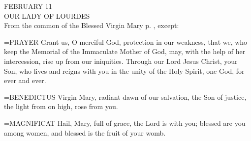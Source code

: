 \begin{center}\normalsize FEBRUARY 11\\
\footnotesize OUR LADY OF LOURDES\\
\footnotesize From the common of the Blessed Virgin Mary p.   , except:\\
\end{center}

\hangindent=\parindent \small{PRAYER 
Grant us, O merciful God, protection in our weakness,
that we, who keep the Memorial of the Immaculate Mother of God,
may, with the help of her intercession,
rise up from our iniquities.
Through our Lord Jesus Christ, your Son,
who lives and reigns with you in the unity of the Holy Spirit,
one God, for ever and ever.\\}
 
\hangindent=\parindent \small{BENEDICTUS  Virgin Mary, radiant dawn of our salvation, the Son of
justice, the light from on high, rose from you.\\}
 
\hangindent=\parindent \small{MAGNIFICAT  Hail, Mary, full of grace, the Lord is with you; blessed are
you among women, and blessed is the fruit of your womb.\\}
 

